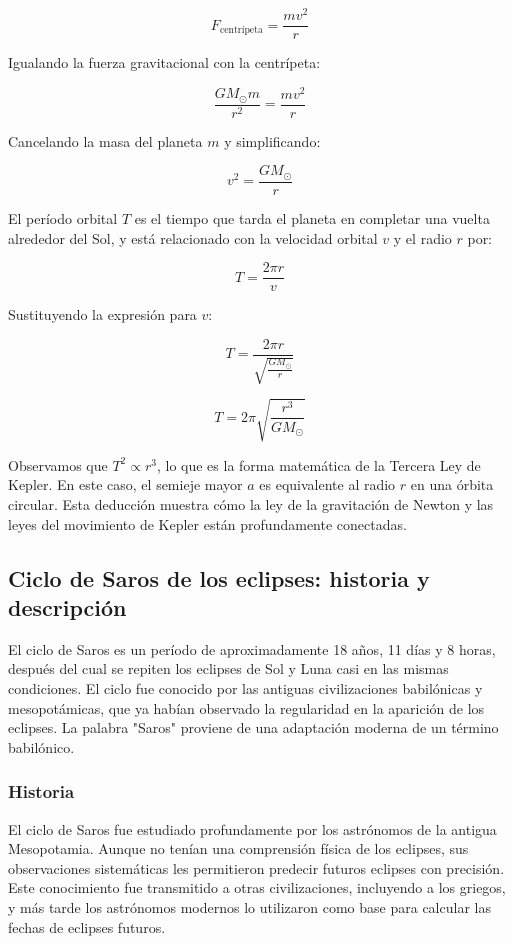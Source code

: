 \documentclass{article}
\begin{document}
\[
F_{\text{centrípeta}} = \frac{m v^2}{r}
\]

Igualando la fuerza gravitacional con la centrípeta:

\[
\frac{G M_{\odot} m}{r^2} = \frac{m v^2}{r}
\]

Cancelando la masa del planeta \(m\) y simplificando:

\[
v^2 = \frac{G M_{\odot}}{r}
\]

El período orbital \(T\) es el tiempo que tarda el planeta en completar una vuelta alrededor del Sol, y está relacionado con la velocidad orbital \(v\) y el radio \(r\) por:

\[
T = \frac{2 \pi r}{v}
\]

Sustituyendo la expresión para \(v\):

\[
T = \frac{2 \pi r}{\sqrt{\frac{G M_{\odot}}{r}}}
\]

\[
T = 2 \pi \sqrt{\frac{r^3}{G M_{\odot}}}
\]

Observamos que \(T^2 \propto r^3\), lo que es la forma matemática de la Tercera Ley de Kepler. En este caso, el semieje mayor \(a\) es equivalente al radio \(r\) en una órbita circular. Esta deducción muestra cómo la ley de la gravitación de Newton y las leyes del movimiento de Kepler están profundamente conectadas.

\subsection{Ciclo de Saros de los eclipses: historia y descripción}

El ciclo de Saros es un período de aproximadamente 18 años, 11 días y 8 horas, después del cual se repiten los eclipses de Sol y Luna casi en las mismas condiciones. El ciclo fue conocido por las antiguas civilizaciones babilónicas y mesopotámicas, que ya habían observado la regularidad en la aparición de los eclipses. La palabra "Saros" proviene de una adaptación moderna de un término babilónico.

\subsubsection{Historia}

El ciclo de Saros fue estudiado profundamente por los astrónomos de la antigua Mesopotamia. Aunque no tenían una comprensión física de los eclipses, sus observaciones sistemáticas les permitieron predecir futuros eclipses con precisión. Este conocimiento fue transmitido a otras civilizaciones, incluyendo a los griegos, y más tarde los astrónomos modernos lo utilizaron como base para calcular las fechas de eclipses futuros.
\end{document}
